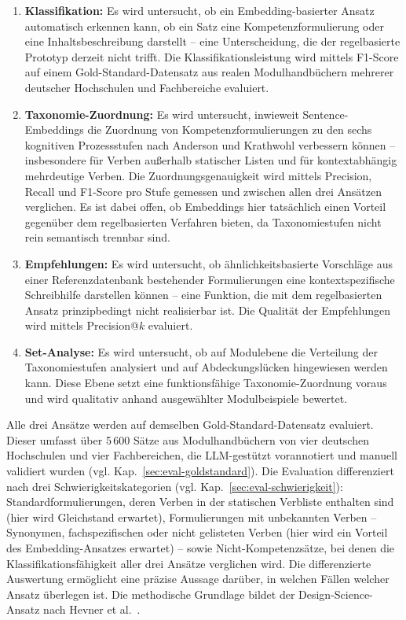 \begin{enumerate}
    \item \textbf{Klassifikation:} Es wird untersucht, ob ein Embedding-basierter Ansatz automatisch erkennen kann, ob ein Satz eine Kompetenzformulierung oder eine Inhaltsbeschreibung darstellt -- eine Unterscheidung, die der regelbasierte Prototyp derzeit nicht trifft. Die Klassifikationsleistung wird mittels F1-Score auf einem Gold-Standard-Datensatz aus realen Modulhandbüchern mehrerer deutscher Hochschulen und Fachbereiche evaluiert.

    \item \textbf{Taxonomie-Zuordnung:} Es wird untersucht, inwieweit Sentence-Embeddings die Zuordnung von Kompetenzformulierungen zu den sechs kognitiven Prozessstufen nach Anderson und Krathwohl verbessern können -- insbesondere für Verben außerhalb statischer Listen und für kontextabhängig mehrdeutige Verben. Die Zuordnungsgenauigkeit wird mittels Precision, Recall und F1-Score pro Stufe gemessen und zwischen allen drei Ansätzen verglichen. Es ist dabei offen, ob Embeddings hier tatsächlich einen Vorteil gegenüber dem regelbasierten Verfahren bieten, da Taxonomiestufen nicht rein semantisch trennbar sind.

    \item \textbf{Empfehlungen:} Es wird untersucht, ob ähnlichkeitsbasierte Vorschläge aus einer Referenzdatenbank bestehender Formulierungen eine kontextspezifische Schreibhilfe darstellen können -- eine Funktion, die mit dem regelbasierten Ansatz prinzipbedingt nicht realisierbar ist. Die Qualität der Empfehlungen wird mittels Precision@$k$ evaluiert.

    \item \textbf{Set-Analyse:} Es wird untersucht, ob auf Modulebene die Verteilung der Taxonomiestufen analysiert und auf Abdeckungslücken hingewiesen werden kann. Diese Ebene setzt eine funktionsfähige Taxonomie-Zuordnung voraus und wird qualitativ anhand ausgewählter Modulbeispiele bewertet.
\end{enumerate}

Alle drei Ansätze werden auf demselben Gold-Standard-Datensatz evaluiert.
Dieser umfasst über 5\,600 Sätze aus Modulhandbüchern von vier deutschen Hochschulen und vier Fachbereichen, die LLM-gestützt vorannotiert und manuell validiert wurden (vgl. Kap.~\ref{sec:eval-goldstandard}).
Die Evaluation differenziert nach drei Schwierigkeitskategorien (vgl. Kap.~\ref{sec:eval-schwierigkeit}): Standardformulierungen, deren Verben in der statischen Verbliste enthalten sind (hier wird Gleichstand erwartet), Formulierungen mit unbekannten Verben -- Synonymen, fachspezifischen oder nicht gelisteten Verben (hier wird ein Vorteil des Embedding-Ansatzes erwartet) -- sowie Nicht-Kompetenz\-sätze, bei denen die Klassifikationsfähigkeit aller drei Ansätze verglichen wird.
Die differenzierte Auswertung ermöglicht eine präzise Aussage darüber, in welchen Fällen welcher Ansatz überlegen ist.
Die methodische Grundlage bildet der Design-Science-Ansatz nach Hevner et al.~\cite{hevner2004designscience}.

